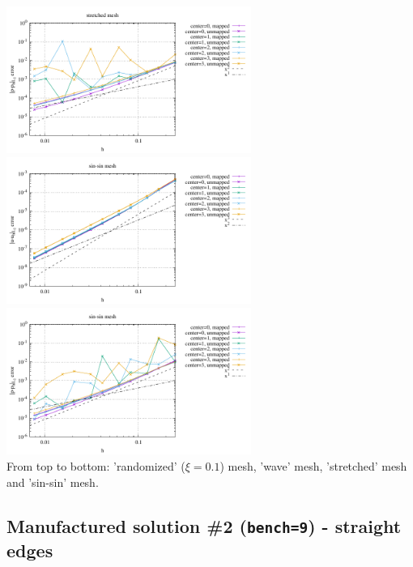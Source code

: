 \begin{center}
\includegraphics[width=8cm]{python_codes/fieldstone_76/results/bench1/curved/errors_P_mt4.pdf}\\
\includegraphics[width=8cm]{python_codes/fieldstone_76/results/bench1/curved/errors_V_mt5.pdf}
\includegraphics[width=8cm]{python_codes/fieldstone_76/results/bench1/curved/errors_P_mt5.pdf}\\
{\captionfont From top to bottom: 'randomized' ($\xi=0.1$) mesh,
'wave' mesh, 'stretched' mesh and 'sin-sin' mesh.}
\end{center}


\newpage
\subsection*{Manufactured solution \#2 ({\tt bench=9}) - straight edges}

